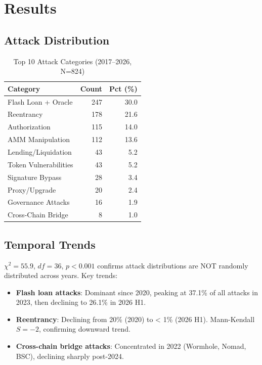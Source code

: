 \documentclass[10pt,conference]{IEEEtran}
\begin{document}
\section{Results}

\subsection{Attack Distribution}

\begin{table}[h]
\centering
\caption{Top 10 Attack Categories (2017–2026, N=824)}
\begin{tabular}{l r r}
\toprule
Category & Count & Pct (\%) \\
\midrule
Flash Loan + Oracle & 247 & 30.0 \\
Reentrancy & 178 & 21.6 \\
Authorization & 115 & 14.0 \\
AMM Manipulation & 112 & 13.6 \\
Lending/Liquidation & 43 & 5.2 \\
Token Vulnerabilities & 43 & 5.2 \\
Signature Bypass & 28 & 3.4 \\
Proxy/Upgrade & 20 & 2.4 \\
Governance Attacks & 16 & 1.9 \\
Cross-Chain Bridge & 8 & 1.0 \\
\bottomrule
\end{tabular}
\end{table}

\subsection{Temporal Trends}
$\chi^2 = 55.9$, $df = 36$, $p < 0.001$ confirms attack distributions are NOT randomly distributed across years. Key trends:

\begin{itemize}
  \item \textbf{Flash loan attacks}: Dominant since 2020, peaking at 37.1\% of all attacks in 2023, then declining to 26.1\% in 2026 H1.
  \item \textbf{Reentrancy}: Declining from 20\% (2020) to < 1\% (2026 H1). Mann-Kendall $S = -2$, confirming downward trend.
  \item \textbf{Cross-chain bridge attacks}: Concentrated in 2022 (Wormhole, Nomad, BSC), declining sharply post-2024.
\end{itemize}
\end{document}
